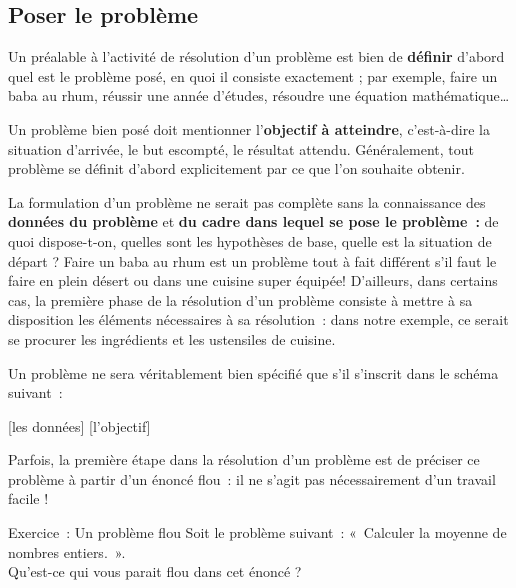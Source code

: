 	\subsection{Poser le problème }
	
		Un préalable à l’activité de résolution d’un problème est bien de
		\textbf{définir} d’abord quel est le problème posé, en quoi il consiste
		exactement ; par exemple, faire un baba au rhum, réussir une année
		d’études, résoudre une équation mathématique\dots
		
		Un problème bien posé doit mentionner l’\textbf{objectif à atteindre},
		c’est-à-dire la situation d’arrivée, le but escompté, le résultat
		attendu. Généralement, tout problème se définit d’abord explicitement
		par ce que l’on souhaite obtenir.
		
		La formulation d’un problème ne serait pas complète sans la connaissance
		des \textbf{données du problème} et \textbf{du cadre dans lequel se
		pose le problème~:} de quoi dispose-t-on, quelles sont les hypothèses
		de base, quelle est la situation de départ ? Faire un baba au rhum est
		un problème tout à fait différent s’il faut le faire en plein désert ou
		dans une cuisine super équipée! D’ailleurs, dans certains cas, la
		première phase de la résolution d’un problème consiste à mettre à sa
		disposition les éléments nécessaires à sa résolution~: dans notre
		exemple, ce serait se procurer les ingrédients et les ustensiles de
		cuisine.
	
		Un problème ne sera véritablement bien spécifié que s’il s’inscrit dans
		le schéma suivant~:
		
		\begin{center}
		\begin{Ovalbox}
		{ [les données]  [l’objectif]}
		\end{Ovalbox}
		\end{center}
	
		Parfois, la première étape dans la résolution d’un problème est de
		préciser ce problème à partir d’un énoncé flou~: il ne s’agit pas
		nécessairement d’un travail facile !

		\begin{Emphase}[exercice]{Exercice~: Un problème flou}
			Soit le problème suivant~: «~Calculer la moyenne de nombres entiers.~».
			\\Qu'est-ce qui vous parait flou dans cet énoncé ?
		\end{Emphase}

